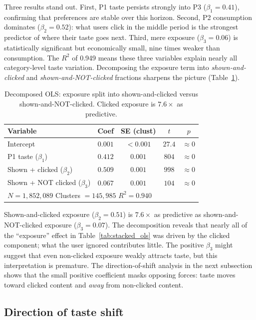 \documentclass[11pt]{article}
\begin{document}
Three results stand out. First, P1 taste persists strongly into P3 ($\beta_1 = 0.41$), confirming that preferences are stable over this horizon. Second, P2 consumption dominates ($\beta_2 = 0.52$): what users click in the middle period is the strongest predictor of where their taste goes next. Third, mere exposure ($\beta_3 = 0.06$) is statistically significant but economically small, nine times weaker than consumption. The $R^2$ of 0.949 means these three variables explain nearly all category-level taste variation. Decomposing the exposure term into \emph{shown-and-clicked} and \emph{shown-and-NOT-clicked} fractions sharpens the picture (Table~\ref{tab:decomposed_ols}).

\begin{table}[ht]
\centering
\caption{Decomposed OLS: exposure split into shown-and-clicked versus shown-and-NOT-clicked. Clicked exposure is $7.6\times$ as predictive.}
\label{tab:decomposed_ols}
\begin{tabular}{lcccc}
\toprule
Variable & Coef & SE (clust) & $t$ & $p$ \\
\midrule
Intercept & $0.001$ & $<0.001$ & $27.4$ & $\approx 0$ \\
P1 taste ($\beta_1$) & $0.412$ & $0.001$ & $804$ & $\approx 0$ \\
Shown + clicked ($\beta_2$) & $\mathbf{0.509}$ & $0.001$ & $998$ & $\approx 0$ \\
Shown + NOT clicked ($\beta_3$) & $\mathbf{0.067}$ & $0.001$ & $104$ & $\approx 0$ \\
\midrule
\multicolumn{5}{l}{$N = 1{,}852{,}089$ \quad Clusters $= 145{,}985$ \quad $R^2 = 0.940$} \\
\bottomrule
\end{tabular}
\end{table}
\FloatBarrier

Shown-and-clicked exposure ($\beta_2 = 0.51$) is $7.6\times$ as predictive as shown-and-NOT-clicked exposure ($\beta_3 = 0.07$). The decomposition reveals that nearly all of the ``exposure'' effect in Table~\ref{tab:stacked_ols} was driven by the clicked component; what the user ignored contributes little. The positive $\beta_3$ might suggest that even non-clicked exposure weakly attracts taste, but this interpretation is premature. The direction-of-shift analysis in the next subsection shows that the small positive coefficient masks opposing forces: taste moves toward clicked content and \emph{away} from non-clicked content.

\subsection{Direction of taste shift}
\end{document}
